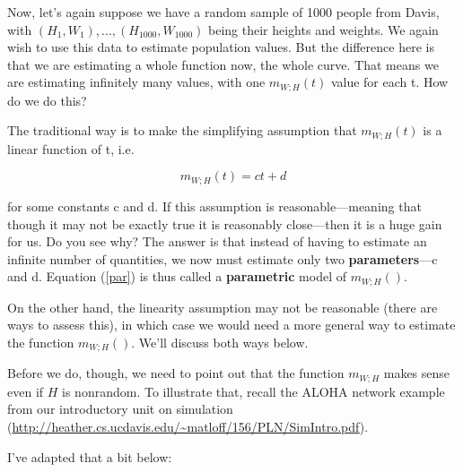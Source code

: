 Now, let's again suppose we have a random sample of 1000 people from
Davis, with $(H_1,W_1),...,(H_{1000},W_{1000})$ being their heights and
weights.  We again wish to use this data to estimate population values.
But the difference here is that we are estimating a whole function now,
the whole curve.  That means we are estimating infinitely many values,
with one $m_{W;H}(t)$ value for each t.  How do we do this?

The traditional way is to make the simplifying assumption that $m_{W;H}(t)$
is a linear function of t, i.e.

\begin{equation}
\label{par}
m_{W;H}(t) = ct+d
\end{equation}

for some constants c and d.  If this assumption is reasonable---meaning
that though it may not be exactly true it is reasonably close---then it
is a huge gain for us.  Do you see why?  The answer is that instead of
having to estimate an infinite number of quantities, we now must
estimate only two {\bf parameters}---c and d.  Equation (\ref{par}) is
thus called a {\bf parametric} model of $m_{W;H}()$.

On the other hand, the linearity assumption may not be reasonable (there
are ways to assess this), in which case we would need a more general way
to estimate the function $m_{W;H}()$.  We'll discuss both ways below.

Before we do, though, we need to point out that the function $m_{W;H}$
makes sense even if $H$ is nonrandom.  To illustrate that, recall the
ALOHA network example from our introductory unit on simulation
(\url{http://heather.cs.ucdavis.edu/~matloff/156/PLN/SimIntro.pdf}).

I've adapted that a bit below:

